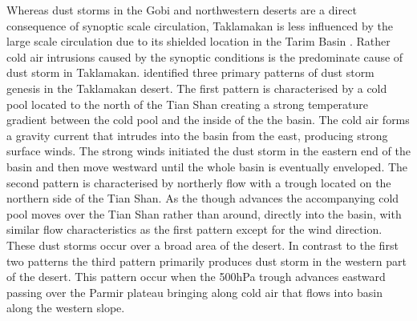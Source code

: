 Whereas dust storms in the Gobi and northwestern deserts are a direct consequence of synoptic scale circulation, Taklamakan is less influenced by the large scale circulation due to its shielded location in the Tarim Basin \parencite{takemi2005dust}.
Rather cold air intrusions caused by the synoptic conditions is the predominate cause of dust storm in Taklamakan. 
\textcite{aoki2005dust} identified three primary patterns of dust storm genesis in the Taklamakan desert. 
The first pattern is characterised by a cold pool located to the north of the Tian Shan creating a strong temperature gradient between the cold pool and the inside of the the basin. 
The cold air forms a gravity current that intrudes into the basin from the east, producing strong surface winds. 
The strong winds initiated the dust storm in the eastern end of the basin and then move westward until the whole basin is eventually enveloped. 
The second pattern is characterised by northerly flow with a trough located on the northern side of the Tian Shan. 
As the though advances the accompanying cold pool moves over the Tian Shan rather than around, directly into the basin, with similar flow characteristics as the first pattern except for the wind direction. 
These dust storms occur over a broad area of the desert. In contrast to the first two patterns the third pattern primarily produces dust storm in the western part of the desert. This pattern occur when the 500hPa trough advances eastward passing over the Parmir plateau bringing along cold air that flows into basin along the western slope. 

